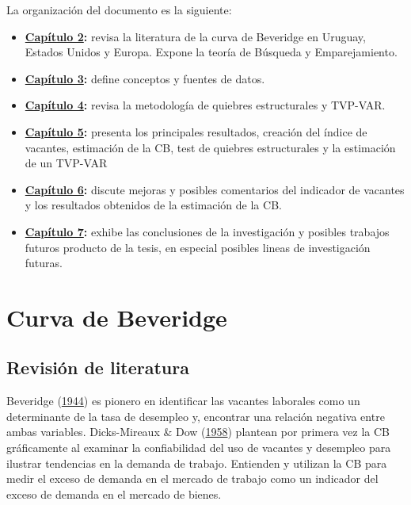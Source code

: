 \documentclass[12pt,oneside]{reedthesis}
\begin{document}
La organización del documento es la siguiente:
\begin{itemize}
\item
  \textbf{\protect\hyperlink{cap:Fundamentos}{Capítulo 2}:} revisa la literatura de la curva de Beveridge en Uruguay, Estados Unidos y Europa. Expone la teoría de Búsqueda y Emparejamiento.
\item
  \textbf{\protect\hyperlink{cap:Datos}{Capítulo 3}:} define conceptos y fuentes de datos.
\item
  \textbf{\protect\hyperlink{cap:Metodologuxeda}{Capítulo 4}:} revisa la metodología de quiebres estructurales y TVP-VAR.
\item
  \textbf{\protect\hyperlink{cap:Resultados}{Capítulo 5}:} presenta los principales resultados, creación del índice de vacantes, estimación de la CB, test de quiebres estructurales y la estimación de un TVP-VAR
\item
  \textbf{\protect\hyperlink{cap:Discusion}{Capítulo 6}:} discute mejoras y posibles comentarios del indicador de vacantes y los resultados obtenidos de la estimación de la CB.
\item
  \textbf{\protect\hyperlink{cap:Conclusiones}{Capítulo 7}:} exhibe las conclusiones de la investigación y posibles trabajos futuros producto de la tesis, en especial posibles lineas de investigación futuras.
\end{itemize}
\hypertarget{cap:Fundamentos}{%
\chapter{Curva de Beveridge}\label{cap:Fundamentos}}

\hypertarget{revisiuxf3n-de-literatura}{%
\section{Revisión de literatura}\label{revisiuxf3n-de-literatura}}

Beveridge (\protect\hyperlink{ref-Beveridge}{1944}) es pionero en identificar las vacantes laborales como un determinante de la tasa de desempleo y, encontrar una relación negativa entre ambas variables. Dicks-Mireaux \& Dow (\protect\hyperlink{ref-Dicks-Mireaux1958}{1958}) plantean por primera vez la CB gráficamente al examinar la confiabilidad del uso de vacantes y desempleo para ilustrar tendencias en la demanda de trabajo. Entienden y utilizan la CB para medir el exceso de demanda en el mercado de trabajo como un indicador del exceso de demanda en el mercado de bienes.
\end{document}
